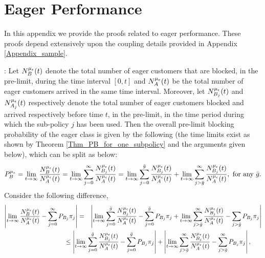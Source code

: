 \section{Eager Performance}  
\label{Appendix_eager}

In this appendix we provide the proofs related to eager performance. These proofs depend extensively upon the coupling  details provided in Appendix \ref{Appendix_sample}.


: Let $N_B^{\mu_\epsilon} (t)$ denote the total number of eager customers that are blocked, in the pre-limit, during the time interval $\left[ 0, t\right]$ and  $N_A^{\mu_\epsilon} (t)$ be  the total number of eager customers arrived in the same time interval. Moreover, let $N_{B_j}^{\mu_\epsilon} (t)$ and $N_{A_j}^{\mu_\epsilon} (t)$ respectively denote the total number of eager customers blocked and arrived respectively before time $t$, in the pre-limit, in the time period  during  which the sub-policy $j$ has been used. %
Then the overall pre-limit blocking probability of the eager class is given by the following  (the time limits exist as shown by Theorem \ref{Thm_PB_for_one_subpolicy} and the arguments given below), which can be split as below:
	$$
P_B^{\mu_\epsilon} =	\lim\limits_{t \to \infty } \frac{N_B^{\mu_\epsilon} (t)}{N_A^{\mu_\epsilon} (t)}
	= \lim\limits_{t \to \infty }  \sum_{j=0}^\infty \frac{N_{B_j}^{\mu_\epsilon} (t)}{N_A^{\mu_\epsilon} (t)}
	= \lim\limits_{t \to \infty }  \sum_{j=0}^{\bar{g}} \frac{N_{B_j}^{\mu_\epsilon} (t)}{N_A^{\mu_\epsilon} (t)}  + \lim\limits_{t \to \infty }  \sum_{j> \bar{g}}^\infty \frac{N_{B_j}^{\mu_\epsilon} (t)}{N_A^{\mu_\epsilon} (t)} , \mbox{ for any } {\bar g}. 
	$$
	Consider the following difference,
	\begin{eqnarray}
	\left| \lim\limits_{t \to \infty } \frac{N_B^\mue (t)}{N_A^\mue (t)} - \sum_{j = 0}^{\infty} P_{B_j} {\pi}_j \right| 
	&=& \left| \lim\limits_{t \to \infty }  \sum_{j=0}^{\bar{g}} \frac{N_{B_j}^\mue (t)}{N_A^\mue (t)} - \sum_{j = 0}^{{\bar{g}}} P_{B_j} {\pi}_j  + \lim\limits_{t \to \infty }  \sum_{j> \bar{g}}^\infty \frac{N_{B_j}^\mue (t)}{N_A^\mue (t)} - \sum_{j > \bar{g}} P_{B_j} {\pi}_j  \right|  \nonumber  \\
 && 	\hspace{-15mm} \leq
		  \left| \lim\limits_{t \to \infty }  \sum_{j=0}^{\bar{g}} \frac{N_{B_j}^\mue (t)}{N_A^\mue (t)} - \sum_{j = 0}^{{\bar{g}}} P_{B_j} {\pi}_j \right| + \left| \lim\limits_{t \to \infty }  \sum_{j> \bar{g}}^\infty \frac{N_{B_j}^\mue (t)}{N_A^\mue (t)} - \sum_{j > \bar{g}}^{\infty} P_{B_j} {\pi}_j  \right| , \label{Eqn_Final_Diff} \hspace{6mm}
	\end{eqnarray}
